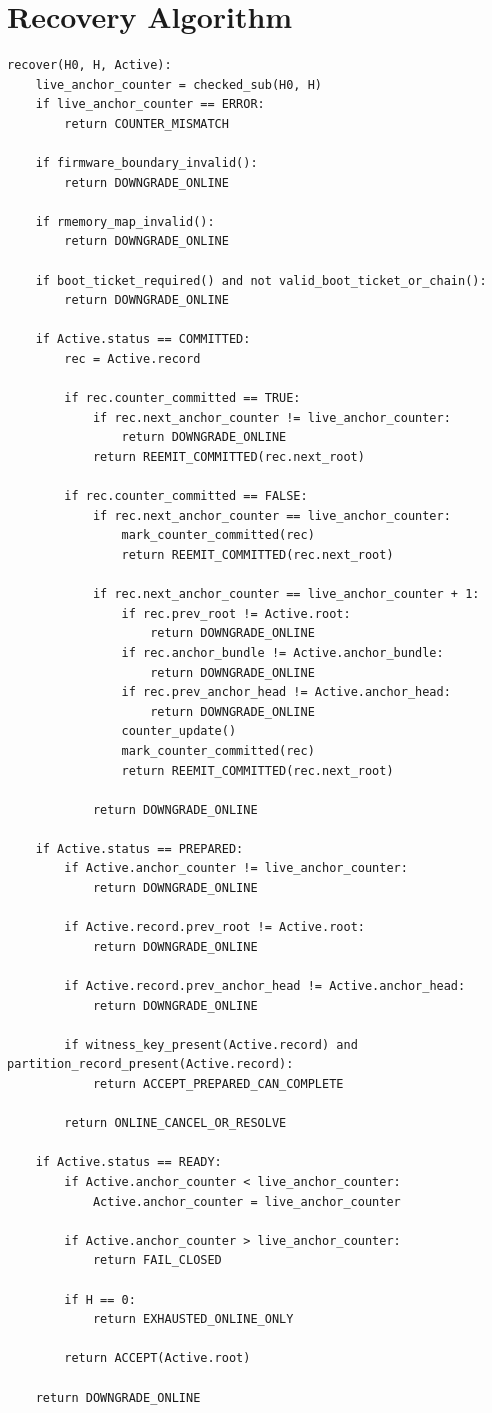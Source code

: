 \documentclass[11pt]{article}
\theoremstyle{definition}
\theoremstyle{remark}
\begin{document}
\section{Recovery Algorithm}

\begin{lstlisting}
recover(H0, H, Active):
    live_anchor_counter = checked_sub(H0, H)
    if live_anchor_counter == ERROR:
        return COUNTER_MISMATCH

    if firmware_boundary_invalid():
        return DOWNGRADE_ONLINE

    if rmemory_map_invalid():
        return DOWNGRADE_ONLINE

    if boot_ticket_required() and not valid_boot_ticket_or_chain():
        return DOWNGRADE_ONLINE

    if Active.status == COMMITTED:
        rec = Active.record

        if rec.counter_committed == TRUE:
            if rec.next_anchor_counter != live_anchor_counter:
                return DOWNGRADE_ONLINE
            return REEMIT_COMMITTED(rec.next_root)

        if rec.counter_committed == FALSE:
            if rec.next_anchor_counter == live_anchor_counter:
                mark_counter_committed(rec)
                return REEMIT_COMMITTED(rec.next_root)

            if rec.next_anchor_counter == live_anchor_counter + 1:
                if rec.prev_root != Active.root:
                    return DOWNGRADE_ONLINE
                if rec.anchor_bundle != Active.anchor_bundle:
                    return DOWNGRADE_ONLINE
                if rec.prev_anchor_head != Active.anchor_head:
                    return DOWNGRADE_ONLINE
                counter_update()
                mark_counter_committed(rec)
                return REEMIT_COMMITTED(rec.next_root)

            return DOWNGRADE_ONLINE

    if Active.status == PREPARED:
        if Active.anchor_counter != live_anchor_counter:
            return DOWNGRADE_ONLINE

        if Active.record.prev_root != Active.root:
            return DOWNGRADE_ONLINE

        if Active.record.prev_anchor_head != Active.anchor_head:
            return DOWNGRADE_ONLINE

        if witness_key_present(Active.record) and partition_record_present(Active.record):
            return ACCEPT_PREPARED_CAN_COMPLETE

        return ONLINE_CANCEL_OR_RESOLVE

    if Active.status == READY:
        if Active.anchor_counter < live_anchor_counter:
            Active.anchor_counter = live_anchor_counter

        if Active.anchor_counter > live_anchor_counter:
            return FAIL_CLOSED

        if H == 0:
            return EXHAUSTED_ONLINE_ONLY

        return ACCEPT(Active.root)

    return DOWNGRADE_ONLINE
\end{lstlisting}
\end{document}
